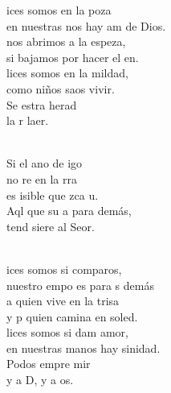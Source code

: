 \documentclass[12pt]{article}
\begin{document}
\begin{multicols*}{2}
\begin{cancion}[Bienaventuranzas][Kairoi]%
	ices somos en la poza\\
	en nuestras nos hay am de Dios.\\
	nos abrimos a la espeza,\\
	si bajamos por hacer el en.\\
	lices somos en la mildad,\\
	como niños saos vivir.\\
	Se estra herad\\
	la r laer.\\\jump\\
	\begin{chorus}%
	Si el ano de igo \\
	no re en la rra\\
	es isible que zca u.\\
	Aql que  su a para  demás,\\
	tend siere al Seor.\\
	\end{chorus}%
	\jump\\
	ices somos si comparos,\\
	nuestro empo es para s demás\\
	a quien vive en la trisa\\
	y p quien camina en soled.\\
	lices somos si dam amor,\\
	en nuestras manos hay sinidad.\\
	Podos empre mir\\
	y  a D, y  a os.\\\jump\\

\end{cancion}
\end{multicols*}
\end{document}

